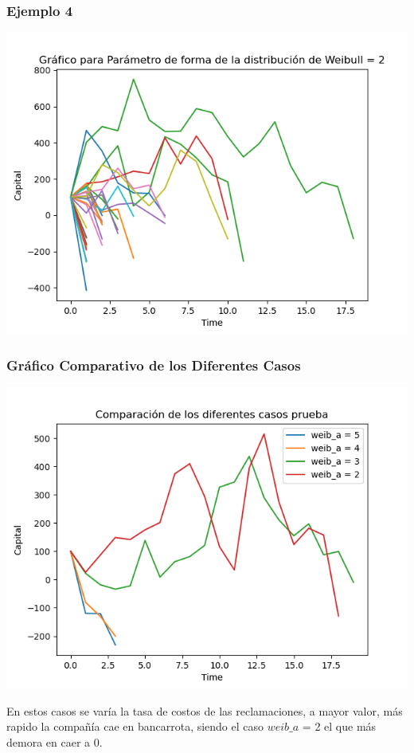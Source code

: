 \documentclass{article}
\begin{document}
\subsubsection{Ejemplo 4}
\includegraphics[scale = 0.8]{weib4.png}

\subsubsection{Gráfico Comparativo de los Diferentes Casos}
\includegraphics[scale = 0.8]{weibcomp.png}

En estos casos se varía la tasa de costos de las reclamaciones, a mayor valor, más rapido la compañía cae en bancarrota, siendo el caso $weib\_a$ = 2 el que más demora en caer a 0.\\
\end{document}

